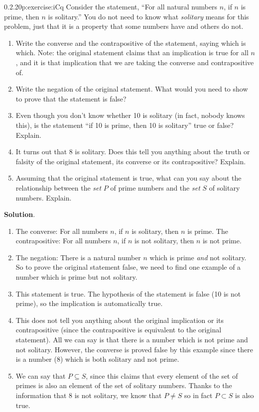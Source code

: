 \documentclass[twoside,11pt,]{book}
\newcommand{\blocktitlefont}{\relax}
\numberwithin{equation}{chapter}
\begin{document}
\begin{divisionsolution}{0.2.20}{}{p:exercise:iCq}%
Consider the statement, ``For all natural numbers \(n\), if \(n\) is prime, then \(n\) is solitary.'' You do not need to know what \emph{solitary} means for this problem, just that it is a property that some numbers have and others do not.%
\begin{enumerate}[label=(\alph*)]
\item{}Write the converse and the contrapositive of the statement, saying which is which. Note: the original statement claims that an implication is true for all \(n\), and it is that implication that we are taking the converse and contrapositive of.%
\item{}Write the negation of the original statement. What would you need to show to prove that the statement is false?%
\item{}Even though you don't know whether 10 is solitary (in fact, nobody knows this), is the statement ``if 10 is prime, then 10 is solitary'' true or false? Explain.%
\item{}It turns out that 8 is solitary. Does this tell you anything about the truth or falsity of the original statement, its converse or its contrapositive? Explain.%
\item{}Assuming that the original statement is true, what can you say about the relationship between the \emph{set} \(P\) of prime numbers and the \emph{set} \(S\) of solitary numbers. Explain.%
\end{enumerate}
%
\par\smallskip%
\noindent\textbf{\blocktitlefont Solution}.\quad{}%
\begin{enumerate}[label=(\alph*)]
\item{}The converse: For all numbers \(n\), if \(n\) is solitary, then \(n\) is prime. The contrapositive: For all numbers \(n\), if \(n\) is not solitary, then \(n\) is not prime.%
\item{}The negation: There is a natural number \(n\) which is prime \emph{and} not solitary. So to prove the original statement false, we need to find one example of a number which is prime but not solitary.%
\item{}This statement is true. The hypothesis of the statement is false (10 is not prime), so the implication is automatically true.%
\item{}This does not tell you anything about the original implication or its contrapositive (since the contrapositive is equivalent to the original statement). All we can say is that there is a number which is not prime and not solitary. However, the converse is proved false by this example since there is a number (8) which is both solitary and not prime.%
\item{}We can say that \(P \subseteq S\), since this claims that every element of the set of primes is also an element of the set of solitary numbers. Thanks to the information that 8 is not solitary, we know that \(P \ne S\) so in fact \(P \subset S\) is also true.%
\end{enumerate}
%
\end{divisionsolution}%
\end{document}
